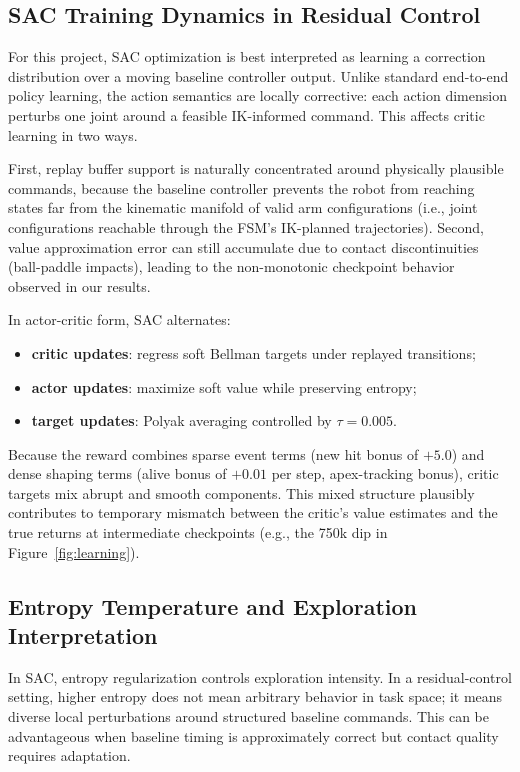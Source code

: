 \documentclass[10pt,twocolumn,letterpaper]{article}
\begin{document}
\subsection{SAC Training Dynamics in Residual Control}
For this project, SAC optimization is best interpreted as learning a correction distribution over a moving baseline controller output. Unlike standard end-to-end policy learning, the action semantics are locally corrective: each action dimension perturbs one joint around a feasible IK-informed command. This affects critic learning in two ways.

First, replay buffer support is naturally concentrated around physically plausible commands, because the baseline controller prevents the robot from reaching states far from the kinematic manifold of valid arm configurations (i.e., joint configurations reachable through the FSM's IK-planned trajectories). Second, value approximation error can still accumulate due to contact discontinuities (ball-paddle impacts), leading to the non-monotonic checkpoint behavior observed in our results.

In actor-critic form, SAC alternates:
\begin{itemize}[leftmargin=*,noitemsep]
    \item \textbf{critic updates}: regress soft Bellman targets under replayed transitions;
    \item \textbf{actor updates}: maximize soft value while preserving entropy;
    \item \textbf{target updates}: Polyak averaging controlled by $\tau = 0.005$.
\end{itemize}
Because the reward combines sparse event terms (new hit bonus of $+5.0$) and dense shaping terms (alive bonus of $+0.01$ per step, apex-tracking bonus), critic targets mix abrupt and smooth components. This mixed structure plausibly contributes to temporary mismatch between the critic's value estimates and the true returns at intermediate checkpoints (e.g., the 750k dip in Figure~\ref{fig:learning}).

\subsection{Entropy Temperature and Exploration Interpretation}
In SAC, entropy regularization controls exploration intensity. In a residual-control setting, higher entropy does not mean arbitrary behavior in task space; it means diverse local perturbations around structured baseline commands. This can be advantageous when baseline timing is approximately correct but contact quality requires adaptation.
\end{document}
